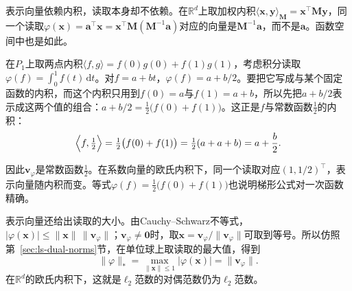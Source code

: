 表示向量依赖内积，读取本身却不依赖。在$\mathbb R^d$上取加权内积$\langle\bm x,\bm y\rangle_{\bm M}=\bm x^\top\bm M\bm y$，同一个读取$\varphi(\bm x)=\bm a^\top\bm x=\bm x^\top\bm M(\bm M^{-1}\bm a)$对应的向量是$\bm M^{-1}\bm a$，而不是$\bm a$。函数空间中也是如此。
\begin{example}[积分读取在两点内积下的表示向量]
\label{ex:ls-riesz-integral-two-point}
在$P_1$上取两点内积$\langle f,g\rangle=f(0)g(0)+f(1)g(1)$，考虑积分读取$\varphi(f)=\int_0^1f(t)\,\mathrm dt$。对$f=a+bt$，$\varphi(f)=a+b/2$。要把它写成与某个固定函数的内积，而这个内积只用到$f(0)=a$与$f(1)=a+b$，所以先把$a+b/2$表示成这两个值的组合：$a+b/2=\tfrac12\bigl(f(0)+f(1)\bigr)$。这正是$f$与常数函数$\tfrac12$的内积：
\[
 \Bigl\langle f,\tfrac12\Bigr\rangle=\tfrac12\bigl(f(0)+f(1)\bigr)=\tfrac12(a+a+b)=a+\frac b2 .
\]

因此$\bm v_\varphi$是常数函数$\tfrac12$。在系数向量的欧氏内积下，同一个读取对应$(1,1/2)^\top$，表示向量随内积而变。等式$\varphi(f)=\tfrac12\bigl(f(0)+f(1)\bigr)$也说明梯形公式对一次函数精确。
\end{example}
表示向量还给出读取的大小。由Cauchy--Schwarz不等式，$|\varphi(\bm x)|\leq\lVert\bm x\rVert\,\lVert\bm v_\varphi\rVert$；$\bm v_\varphi\neq\bm0$时，取$\bm x=\bm v_\varphi/\lVert\bm v_\varphi\rVert$可取到等号。所以仿照第~\ref{sec:ls-dual-norms}节，在单位球上取读取的最大值，得到
\[
 \lVert\varphi\rVert_*=\max_{\lVert\bm x\rVert\leq1}|\varphi(\bm x)|=\lVert\bm v_\varphi\rVert .
\]
在$\mathbb R^d$的欧氏内积下，这就是$\ell_2$范数的对偶范数仍为$\ell_2$范数。
